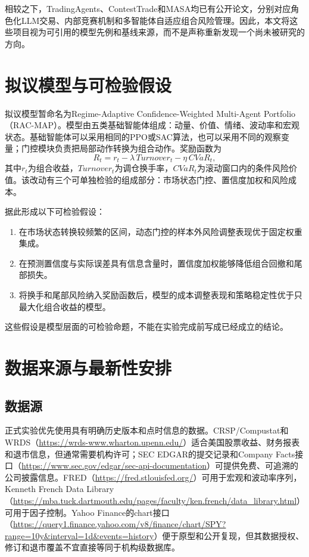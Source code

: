 \documentclass[10.5pt]{article}
\begin{document}
相较之下，TradingAgents、ContestTrade和MASA均已有公开论文，分别对应角色化LLM交易、内部竞赛机制和多智能体自适应组合风险管理\citep{XiaoSunLuo2024,ZhaoSunJiang2025,LiTamYeung2024}。因此，本文将这些项目视为可引用的模型先例和基线来源，而不是声称重新发现一个尚未被研究的方向。

\section{拟议模型与可检验假设}

拟议模型暂命名为Regime-Adaptive Confidence-Weighted Multi-Agent Portfolio（RAC-MAP）。模型由五类基础智能体组成：动量、价值、情绪、波动率和宏观状态。基础智能体可以采用相同的PPO或SAC算法，也可以采用不同的观察变量；门控模块负责把局部动作转换为组合动作。奖励函数为
\begin{equation}
    R_t=r_t-\lambda\,Turnover_t-\eta\,CVaR_t,
\end{equation}
其中$r_t$为组合收益，$Turnover_t$为调仓换手率，$CVaR_t$为滚动窗口内的条件风险价值。该改动有三个可单独检验的组成部分：市场状态门控、置信度加权和风险成本。

据此形成以下可检验假设：
\begin{enumerate}
    \item 在市场状态转换较频繁的区间，动态门控的样本外风险调整表现优于固定权重集成。
    \item 在预测置信度与实际误差具有信息含量时，置信度加权能够降低组合回撤和尾部损失。
    \item 将换手和尾部风险纳入奖励函数后，模型的成本调整表现和策略稳定性优于只最大化组合收益的模型。
\end{enumerate}

这些假设是模型层面的可检验命题，不能在实验完成前写成已经成立的结论。

\section{数据来源与最新性安排}

\subsection{数据源}

正式实验优先使用具有明确历史版本和点时信息的数据。CRSP/Compustat和WRDS（\url{https://wrds-www.wharton.upenn.edu/}）适合美国股票收益、财务报表和退市信息，但通常需要机构许可；SEC EDGAR的提交记录和Company Facts接口（\url{https://www.sec.gov/edgar/sec-api-documentation}）可提供免费、可追溯的公司披露信息。FRED（\url{https://fred.stlouisfed.org/}）可用于宏观和波动率序列，Kenneth French Data Library（\url{https://mba.tuck.dartmouth.edu/pages/faculty/ken.french/data_library.html}）可用于因子控制。Yahoo Finance的chart接口（\url{https://query1.finance.yahoo.com/v8/finance/chart/SPY?range=10y&interval=1d&events=history}）便于原型和公开复现，但其数据授权、修订和退市覆盖不宜直接等同于机构级数据库。
\end{document}
